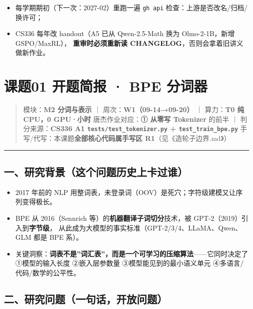 \documentclass[
  chinese,
  11pt,
]{ctexart}
\providecommand{\tightlist}{%
  \setlength{\itemsep}{0pt}\setlength{\parskip}{0pt}}
\begin{document}
\begin{itemize}
\tightlist
\item
  每学期期初（下一次：2027-02）重跑一遍 \texttt{gh\ api} 检查：上游是否改名/归档/换许可；
\item
  CS336 每年改 handout（A5 已从 Qwen-2.5-Math 换为 Olmo-2-1B，新增 GSPO/MaxRL）， \textbf{重审时必须重新读 CHANGELOG}，否则会拿着旧讲义做新作业。
\end{itemize}

\newpage

\section{课题01 开题简报 · BPE 分词器}\label{ux8bfeux989801-ux5f00ux9898ux7b80ux62a5-bpe-ux5206ux8bcdux5668}

\begin{quote}
模块：\textbf{M2 分词与表示} ｜ 周次：\textbf{W1（09-14→09-20）} ｜ 算力：\textbf{T0 纯 CPU，0 GPU·小时} 唐杰作业对应：\textbf{① 从零写 Tokenizer} 的前半 ｜ 判分来源：\textbf{CS336 A1 \texttt{tests/test\_tokenizer.py} + \texttt{test\_train\_bpe.py}} 手写/代写：本课题\textbf{全部核心代码属手写区 R1}（见《造轮子边界.md》）
\end{quote}

\begin{center}\rule{0.5\linewidth}{0.5pt}\end{center}

\subsection{一、研究背景（这个问题历史上卡过谁）}\label{ux4e00ux7814ux7a76ux80ccux666fux8fd9ux4e2aux95eeux9898ux5386ux53f2ux4e0aux5361ux8fc7ux8c01}

\begin{itemize}
\tightlist
\item
  2017 年前的 NLP 用整词表，未登录词（OOV）是死穴；字符级建模又让序列变得极长。
\item
  BPE 从 2016（Sennrich 等）的\textbf{机器翻译子词切分}技术，被 GPT-2（2019）引入到\textbf{字节级}， 从此成为大模型的事实标准（GPT-2/3/4、LLaMA、Qwen、GLM 都是 BPE 系）。
\item
  关键洞察：\textbf{词表不是''词汇表''，而是一个可学习的压缩算法}------它同时决定了 ①模型的输入长度 ②嵌入层参数量 ③模型能见到的最小语义单元 ④多语言/代码/数学的公平性。
\end{itemize}

\subsection{二、研究问题（一句话，开放问题）}\label{ux4e8cux7814ux7a76ux95eeux9898ux4e00ux53e5ux8bddux5f00ux653eux95eeux9898}
\end{document}
